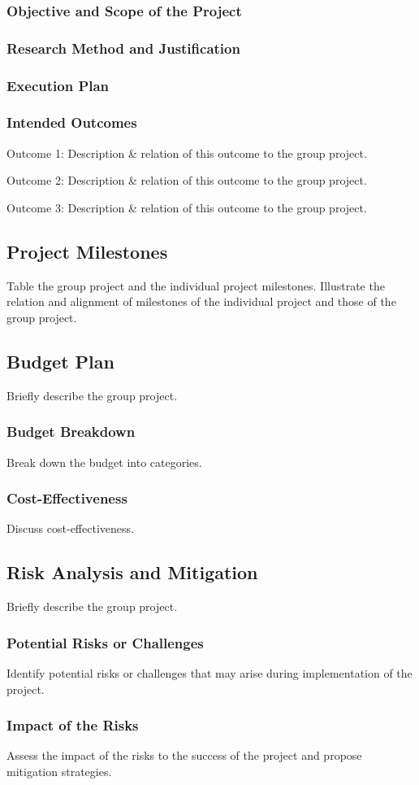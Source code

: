 \subsubsection{Objective and Scope of the Project}

\subsubsection{Research Method and Justification}

\subsubsection{Execution Plan}

\subsubsection{Intended Outcomes}

Outcome 1: Description \& relation of this outcome to the group project. 

Outcome 2: Description \& relation of this outcome to the group project. 

Outcome 3: Description \& relation of this outcome to the group project.


\subsection{Project Milestones}
Table the group project and the individual project milestones. 
Illustrate the relation and alignment of milestones of the individual project and those of the group project.


\subsection{Budget Plan}
Briefly describe the group project.

\subsubsection{Budget Breakdown}
Break down the budget into categories.

\subsubsection{Cost-Effectiveness}
Discuss cost-effectiveness.


\subsection{Risk Analysis and Mitigation}
Briefly describe the group project.

\subsubsection{Potential Risks or Challenges}
Identify potential risks or challenges that may arise during implementation of the project.

\subsubsection{Impact of the Risks}
Assess the impact of the risks to the success of the project and propose mitigation strategies.